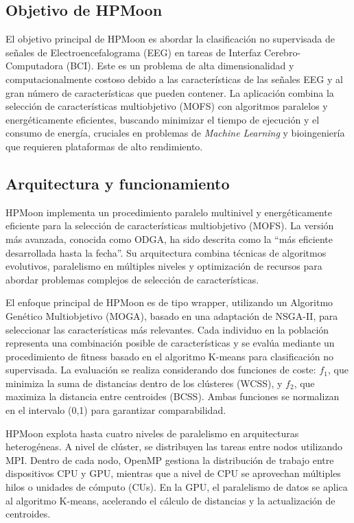 \subsection{Objetivo de HPMoon}\label{subsec:hpm_objetivo}
El objetivo principal de HPMoon es abordar la clasificación no supervisada de señales de Electroencefalograma (\acs{EEG}) en tareas de Interfaz Cerebro-Computadora (\acs{BCI}). Este es un problema de alta dimensionalidad y computacionalmente costoso debido a las características de las señales \acs{EEG} y al gran número de características que pueden contener. La aplicación combina la selección de características multiobjetivo (\acs{MOFS}) con algoritmos paralelos y energéticamente eficientes, buscando minimizar el tiempo de ejecución y el consumo de energía, cruciales en problemas de \textit{Machine Learning} y bioingeniería que requieren plataformas de alto rendimiento.

\subsection{Arquitectura y funcionamiento}\label{subsec:hpm_funcionamiento}

HPMoon implementa un procedimiento paralelo multinivel y energéticamente eficiente para la selección de características multiobjetivo (\acs{MOFS}). La versión más avanzada, conocida como ODGA, ha sido descrita como la ``más eficiente desarrollada hasta la fecha''. Su arquitectura combina técnicas de algoritmos evolutivos, paralelismo en múltiples niveles y optimización de recursos para abordar problemas complejos de selección de características.

El enfoque principal de HPMoon es de tipo wrapper, utilizando un Algoritmo Genético Multiobjetivo (MOGA), basado en una adaptación de NSGA-II, para seleccionar las características más relevantes. Cada individuo en la población representa una combinación posible de características y se evalúa mediante un procedimiento de fitness basado en el algoritmo K-means para clasificación no supervisada. La evaluación se realiza considerando dos funciones de coste: $f_1$, que minimiza la suma de distancias dentro de los clústeres (WCSS), y $f_2$, que maximiza la distancia entre centroides (BCSS). Ambas funciones se normalizan en el intervalo (0,1) para garantizar comparabilidad.

HPMoon explota hasta cuatro niveles de paralelismo en arquitecturas heterogéneas. A nivel de clúster, se distribuyen las tareas entre nodos utilizando MPI. Dentro de cada nodo, OpenMP gestiona la distribución de trabajo entre dispositivos CPU y GPU, mientras que a nivel de CPU se aprovechan múltiples hilos o unidades de cómputo (CUs). En la GPU, el paralelismo de datos se aplica al algoritmo K-means, acelerando el cálculo de distancias y la actualización de centroides.


